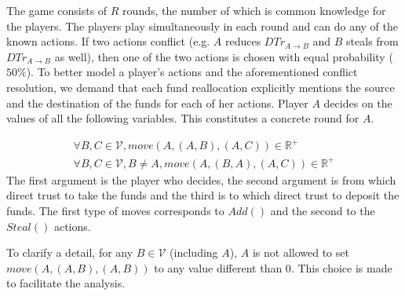   The game consists of $R$ rounds, the number of which is common knowledge for the players. The players play simultaneously in
  each round and can do any of the known actions. If two actions conflict (e.g. $A$ reduces $DTr_{A \rightarrow B}$ and $B$
  steals from $DTr_{A \rightarrow B}$ as well), then one of the two actions is chosen with equal probability ($50\%$). To
  better model a player's actions and the aforementioned conflict resolution, we demand that each fund reallocation explicitly
  mentions the source and the destination of the funds for each of her actions. Player $A$ decides on the values of all the
  following variables. This constitutes a concrete round for $A$.
  
  \begin{gather*}
    \forall B, C \in \mathcal{V}, move\left(A, \left(A, B\right), \left(A, C\right) \right) \in \mathbb{R^+} \\
    \forall B, C \in \mathcal{V}, B \neq A, move\left(A, \left(B, A\right), \left(A, C\right) \right) \in \mathbb{R^+}
  \end{gather*}
  The first argument is the player who decides, the second argument is from which direct trust to take the funds and the third
  is to which direct trust to deposit the funds. The first type of moves corresponds to $Add\left(\right)$ and the second to
  the $Steal\left(\right)$ actions.
  
  To clarify a detail, for any $B \in \mathcal{V}$ (including $A$), $A$ is not allowed to set $move\left(A, \left(A, B\right),
  \left(A, B\right) \right)$ to any value different than 0. This choice is made to facilitate the analysis.
  
